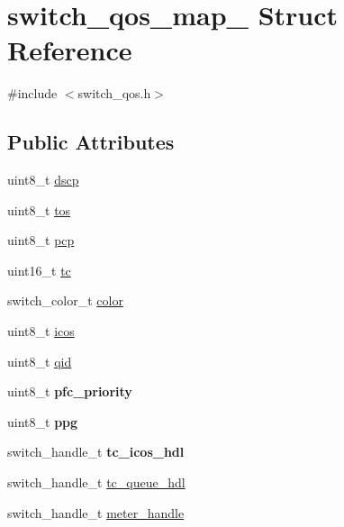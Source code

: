 \hypertarget{structswitch__qos__map__}{\section{switch\+\_\+qos\+\_\+map\+\_\+ Struct Reference}
\label{structswitch__qos__map__}
}


{\ttfamily \#include $<$switch\+\_\+qos.\+h$>$}

\subsection*{Public Attributes}
\begin{DoxyCompactItemize}
\item 
uint8\+\_\+t \hyperlink{structswitch__qos__map___a7f0653e4cdd9ed01f8cea4ac4d50f5f4}{dscp}
\item 
uint8\+\_\+t \hyperlink{structswitch__qos__map___aaf49110404a08639ad4eaf4d97d3b371}{tos}
\item 
uint8\+\_\+t \hyperlink{structswitch__qos__map___a984ee3d39aeabfeba04fda50ba26aeba}{pcp}
\item 
uint16\+\_\+t \hyperlink{structswitch__qos__map___a6196f5599d0982b77ecf96a7e7a5be0d}{tc}
\item 
switch\+\_\+color\+\_\+t \hyperlink{structswitch__qos__map___a91dfa0fce73851413436f9522ab81fcf}{color}
\item 
uint8\+\_\+t \hyperlink{structswitch__qos__map___a7c9e6f77a20653e5954c662a05d1fcf9}{icos}
\item 
uint8\+\_\+t \hyperlink{structswitch__qos__map___af6d243013849a0eba46a0d4884738ce0}{qid}
\item 
\hypertarget{structswitch__qos__map___a19fdf11eb896675cadb60aadce09b3ed}{uint8\+\_\+t {\bfseries pfc\+\_\+priority}}\label{structswitch__qos__map___a19fdf11eb896675cadb60aadce09b3ed}

\item 
\hypertarget{structswitch__qos__map___a6b79ce8f1b0cef335115634ead90cc10}{uint8\+\_\+t {\bfseries ppg}}\label{structswitch__qos__map___a6b79ce8f1b0cef335115634ead90cc10}

\item 
\hypertarget{structswitch__qos__map___a0fc42552ff9efa62d374d827cad94831}{switch\+\_\+handle\+\_\+t {\bfseries tc\+\_\+icos\+\_\+hdl}}\label{structswitch__qos__map___a0fc42552ff9efa62d374d827cad94831}

\item 
switch\+\_\+handle\+\_\+t \hyperlink{structswitch__qos__map___a842e81be713bff69429373269afe5e9e}{tc\+\_\+queue\+\_\+hdl}
\item 
switch\+\_\+handle\+\_\+t \hyperlink{structswitch__qos__map___af751ab6735d72f9c30a4b722ca9ccc36}{meter\+\_\+handle}
\end{DoxyCompactItemize}


